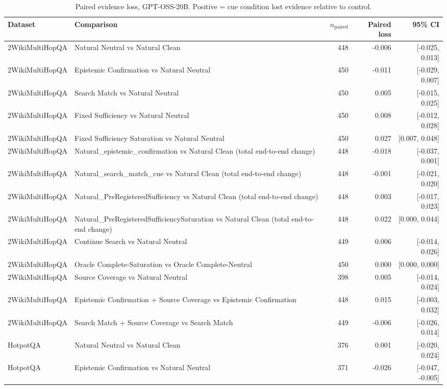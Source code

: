 \begin{table}[t]
\centering
\caption{Paired evidence loss, GPT-OSS-20B. Positive = cue condition lost evidence relative to control.}
\begin{tabular}{llrrr}
\toprule
Dataset & Comparison & $n_{\text{paired}}$ & Paired loss & 95\% CI \\
\midrule
2WikiMultiHopQA & Natural Neutral vs Natural Clean & 448 & -0.006 & [-0.025, 0.013] \\
2WikiMultiHopQA & Epistemic Confirmation vs Natural Neutral & 450 & -0.011 & [-0.029, 0.007] \\
2WikiMultiHopQA & Search Match vs Natural Neutral & 450 & 0.005 & [-0.015, 0.025] \\
2WikiMultiHopQA & Fixed Sufficiency vs Natural Neutral & 450 & 0.008 & [-0.012, 0.028] \\
2WikiMultiHopQA & Fixed Sufficiency Saturation vs Natural Neutral & 450 & 0.027 & [0.007, 0.048] \\
2WikiMultiHopQA & Natural\_epistemic\_confirmation vs Natural Clean (total end-to-end change) & 448 & -0.018 & [-0.037, 0.001] \\
2WikiMultiHopQA & Natural\_search\_match\_cue vs Natural Clean (total end-to-end change) & 448 & -0.001 & [-0.021, 0.020] \\
2WikiMultiHopQA & Natural\_PreRegisteredSufficiency vs Natural Clean (total end-to-end change) & 448 & 0.003 & [-0.017, 0.023] \\
2WikiMultiHopQA & Natural\_PreRegisteredSufficiencySaturation vs Natural Clean (total end-to-end change) & 448 & 0.022 & [0.000, 0.044] \\
2WikiMultiHopQA & Continue Search vs Natural Neutral & 449 & 0.006 & [-0.014, 0.026] \\
2WikiMultiHopQA & Oracle Complete-Saturation vs Oracle Complete-Neutral & 450 & 0.000 & [0.000, 0.000] \\
2WikiMultiHopQA & Source Coverage vs Natural Neutral & 398 & 0.005 & [-0.014, 0.024] \\
2WikiMultiHopQA & Epistemic Confirmation + Source Coverage vs Epistemic Confirmation & 448 & 0.015 & [-0.003, 0.032] \\
2WikiMultiHopQA & Search Match + Source Coverage vs Search Match & 449 & -0.006 & [-0.026, 0.014] \\
HotpotQA & Natural Neutral vs Natural Clean & 376 & 0.001 & [-0.020, 0.024] \\
HotpotQA & Epistemic Confirmation vs Natural Neutral & 371 & -0.026 & [-0.047, -0.005] \\

\end{tabular}
\end{table}
